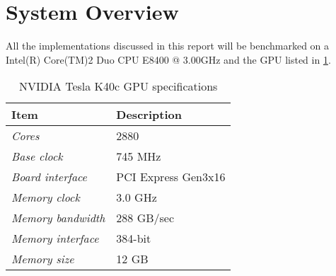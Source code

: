 \documentclass[final]{report}
\begin{document}

\section{System Overview}
All the implementations discussed in this report will be benchmarked on a Intel(R) Core(TM)2 Duo CPU E8400 @ 3.00GHz and the GPU listed in \cref{tab:gpu-specs}.

\begin{table}[H]
	\centering
	\caption{NVIDIA Tesla K40c GPU specifications}
	\label{tab:gpu-specs}
	\begin{tabular}{ll}
		\toprule
			\textbf{Item} &\textbf{Description}\\
		\midrule
			\textit{Cores} & 2880	\\
			\textit{Base clock} & 745 MHz \\
			\textit{Board interface} & PCI Express Gen3x16 \\
			\textit{Memory clock} & 3.0 GHz \\
			\textit{Memory bandwidth} & 288 GB/sec \\
			\textit{Memory interface} & 384-bit \\
			\textit{Memory size} & 12 GB \\
		\bottomrule
	\end{tabular}
\end{table}
\end{document}
